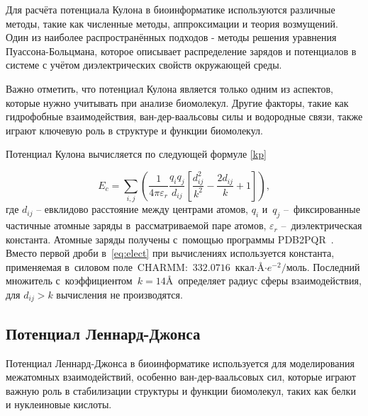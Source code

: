 Для расчёта потенциала Кулона в биоинформатике используются различные методы, такие как численные методы, аппроксимации и теория возмущений. Один из наиболее распространённых подходов - методы решения уравнения Пуассона-Больцмана, которое описывает распределение зарядов и потенциалов в системе с учётом диэлектрических свойств окружающей среды.

Важно отметить, что потенциал Кулона является только одним из аспектов, которые нужно учитывать при анализе биомолекул. Другие факторы, такие как гидрофобные взаимодействия, ван-дер-ваальсовы силы и водородные связи, также играют ключевую роль в структуре и функции биомолекул.

Потенциал Кулона вычисляется по следующей формуле \ref{kp} 

\begin{equation}
	E_{c}=\sum_{i,j}\left({\frac{1}{4 \pi \varepsilon_{r}}} \frac{q_{i}q_{j}}{d_{ij}} \left[ \frac{d^{2}_{ij}}{k^{2}} - \frac{2 d_{ij}}{k} + 1 \right]\right),
	\label{kp}
\end{equation}
где $d_{ij}$ -- евклидово расстояние между центрами атомов, $q_{i}$ и~$q_{j}$ --~фиксированные частичные атомные заряды в~рассматриваемой паре атомов, $\varepsilon_{r}$ --~диэлектрическая константа. Атомные заряды получены с~помощью программы PDB2PQR~\cite{pdb2pqr}. Вместо первой дроби в~\eqref{eq:elect} при вычислениях используется константа, применяемая в~силовом поле~CHARMM:~$332.0716$~ккал${\cdot}$\AA${\cdot}e^{-2}/$моль. Последний множитель с~коэффициентом~$k=14$\AA \ определяет радиус сферы взаимодействия, для $d_{ij} > k$ вычисления не производятся.












\subsection{Потенциал Леннард-Джонса}

Потенциал Леннард-Джонса в биоинформатике используется для моделирования межатомных взаимодействий, особенно ван-дер-ваальсовых сил, которые играют важную роль в стабилизации структуры и функции биомолекул, таких как белки и нуклеиновые кислоты.

